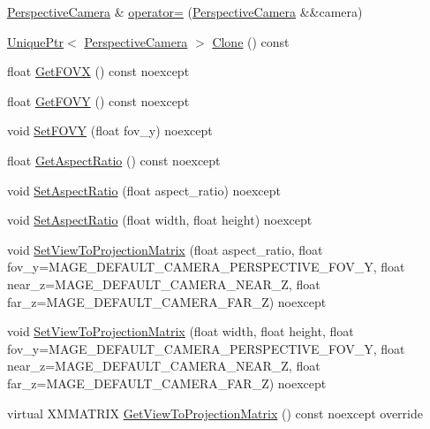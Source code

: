 \begin{DoxyCompactItemize}
\item 
\hyperlink{classmage_1_1_perspective_camera}{Perspective\+Camera} \& \hyperlink{classmage_1_1_perspective_camera_a338c75900237f3623b31b0231a5f5782}{operator=} (\hyperlink{classmage_1_1_perspective_camera}{Perspective\+Camera} \&\&camera)
\item 
\hyperlink{namespacemage_a3316d7143a973e37adf1110f2e80ca31}{Unique\+Ptr}$<$ \hyperlink{classmage_1_1_perspective_camera}{Perspective\+Camera} $>$ \hyperlink{classmage_1_1_perspective_camera_a21545965da7ef1b6f99887bb6d2bb095}{Clone} () const
\item 
float \hyperlink{classmage_1_1_perspective_camera_a7be6cca6d80066aa800fb1ad9c45d56d}{Get\+F\+O\+VX} () const noexcept
\item 
float \hyperlink{classmage_1_1_perspective_camera_a31fbcab811e480c8f58dbcd9b844e91b}{Get\+F\+O\+VY} () const noexcept
\item 
void \hyperlink{classmage_1_1_perspective_camera_aeb7e6f4115d8e15f914f9f8be3580cde}{Set\+F\+O\+VY} (float fov\+\_\+y) noexcept
\item 
float \hyperlink{classmage_1_1_perspective_camera_a500edd42c62a757af0c019e720571251}{Get\+Aspect\+Ratio} () const noexcept
\item 
void \hyperlink{classmage_1_1_perspective_camera_af9357c3361ebec5764e19b23f9a13796}{Set\+Aspect\+Ratio} (float aspect\+\_\+ratio) noexcept
\item 
void \hyperlink{classmage_1_1_perspective_camera_a808b22b7e634eee766915bfdfb54a089}{Set\+Aspect\+Ratio} (float width, float height) noexcept
\item 
void \hyperlink{classmage_1_1_perspective_camera_af145d4d4defe4ca24c669a22fc02c2bc}{Set\+View\+To\+Projection\+Matrix} (float aspect\+\_\+ratio, float fov\+\_\+y=M\+A\+G\+E\+\_\+\+D\+E\+F\+A\+U\+L\+T\+\_\+\+C\+A\+M\+E\+R\+A\+\_\+\+P\+E\+R\+S\+P\+E\+C\+T\+I\+V\+E\+\_\+\+F\+O\+V\+\_\+Y, float near\+\_\+z=M\+A\+G\+E\+\_\+\+D\+E\+F\+A\+U\+L\+T\+\_\+\+C\+A\+M\+E\+R\+A\+\_\+\+N\+E\+A\+R\+\_\+Z, float far\+\_\+z=M\+A\+G\+E\+\_\+\+D\+E\+F\+A\+U\+L\+T\+\_\+\+C\+A\+M\+E\+R\+A\+\_\+\+F\+A\+R\+\_\+Z) noexcept
\item 
void \hyperlink{classmage_1_1_perspective_camera_a4dbbb327c9d063ab58f832896b015e81}{Set\+View\+To\+Projection\+Matrix} (float width, float height, float fov\+\_\+y=M\+A\+G\+E\+\_\+\+D\+E\+F\+A\+U\+L\+T\+\_\+\+C\+A\+M\+E\+R\+A\+\_\+\+P\+E\+R\+S\+P\+E\+C\+T\+I\+V\+E\+\_\+\+F\+O\+V\+\_\+Y, float near\+\_\+z=M\+A\+G\+E\+\_\+\+D\+E\+F\+A\+U\+L\+T\+\_\+\+C\+A\+M\+E\+R\+A\+\_\+\+N\+E\+A\+R\+\_\+Z, float far\+\_\+z=M\+A\+G\+E\+\_\+\+D\+E\+F\+A\+U\+L\+T\+\_\+\+C\+A\+M\+E\+R\+A\+\_\+\+F\+A\+R\+\_\+Z) noexcept
\item 
virtual X\+M\+M\+A\+T\+R\+IX \hyperlink{classmage_1_1_perspective_camera_af2c74a3038563c1c0cda3f1525a814a3}{Get\+View\+To\+Projection\+Matrix} () const noexcept override
\end{DoxyCompactItemize}
